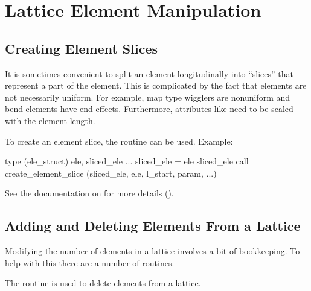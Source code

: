 \chapter{Lattice Element Manipulation}
\label{c:ele.manip}

\section{Creating Element Slices}
\label{s:ele.slice}

It is sometimes convenient to split an element longitudinally into
``slices'' that represent a part of the element.  This is complicated
by the fact that elements are not necessarily uniform.  For example,
map type wigglers are nonuniform and bend elements have end effects.
Furthermore, attributes like  need to be scaled with the
element length.

To create an element slice, the routine
 can be used.
Example:
\begin{example}
  type (ele_struct) ele, sliced_ele
  ...
  sliced_ele = ele
  sliced_ele%
  call create_element_slice (sliced_ele, ele, l_start, param, ...)
\end{example}
See the documentation on  for more details ().

\section{Adding and Deleting Elements From a Lattice}
\label{s:lat.add.delete}

Modifying the number of elements in a lattice involves a bit of
bookkeeping. To help with this there are a number of routines. 

The routine  is
used to delete elements from a lattice.

